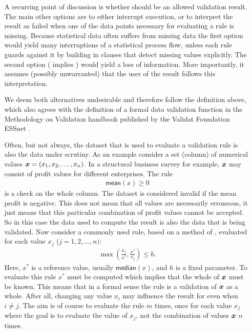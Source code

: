 A recurring point of discussion is whether \na{} should be an allowed
validation result. The main other options are to either interrupt execution, or
to interpret the result as failed when one of the data points
necessary for evaluating a rule is missing. Because statistical data often
suffers from missing data the first option would yield many interruptions of a
statistical process flow, unless each rule guards against it by building in
clauses that detect missing values explicitly. The second option (\na{} implies
\onwaar{}) would yield a loss of information. More importantly, it assumes
(possibly unwarranted) that the user of the result follows this interpretation.

We deem both alternatives undesirable and therefore follow the definition
above, which also agrees with the definition of a formal data validation
function in the Methodology on Validation handbook published by the Validat
Foundation ESSnet \citep{zio2015methodology}.

Often, but not always, the dataset that is used to evaluate a validation rule
is also the data under scrutiny. As an example consider a set (column) of
numerical values $\boldsymbol{x}=(x_1,x_2,\ldots,x_n)$. In a structural business survey
for example, $\boldsymbol{x}$ may consist of profit values for different enterprises.
The rule 
\begin{align*}
\textsf{mean}(x) \geq 0
\end{align*}
is a check on the whole column. The dataset is considered invalid if the mean
profit is negative. This does not mean that all values are necessarily
erroneous, it just means that this particular combination of profit values
cannot be accepted. So in this case the data used to compute the result is also
the data that is being validated. Now consider a commonly used rule, based on a
method of \citet{hiridoglou1986statistical}, evaluated for each value $x_j$
($j=1,2,\ldots, n)$:
\begin{align}
\max\left(\frac{x_j}{x^*},\frac{x^*}{x_j}\right) \leq h.
\label{eq:hbfun}
\end{align}
Here, $x^*$ is a reference value, usually $\textsf{median}(x)$, and $h$ is a
fixed parameter. To evaluate this rule $x^*$ must be computed which implies
that the whole of $\boldsymbol{x}$ must be known. This means that in a formal sense the
rule is a validation of $\boldsymbol{x}$ as a whole. After all, changing any value
$x_{i}$ may influence the result for even when $i\not=j$. The aim is of course
to evaluate the rule $m$ times, once for each value $x_j$ where the goal is to
evaluate the value of $x_j$, not the combination of values $\boldsymbol{x}$ $n$ times.

